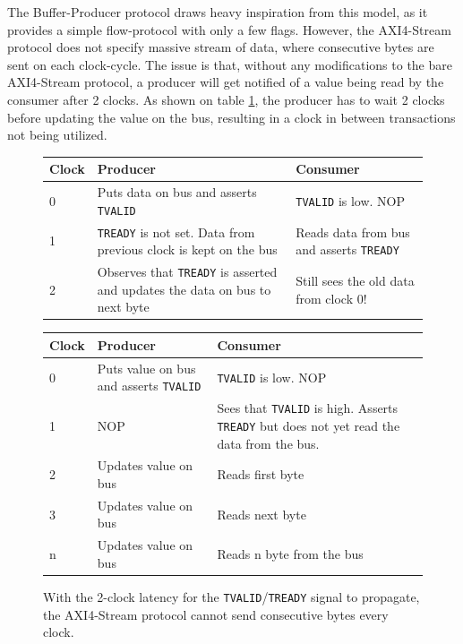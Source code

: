 The Buffer-Producer protocol draws heavy inspiration from this model, as it
provides a simple flow-protocol with only a few flags. However, the AXI4-Stream
protocol does not specify massive stream of data, where consecutive bytes are
sent on each clock-cycle. The issue is that, without any modifications to the
bare AXI4-Stream protocol, a producer will get notified of a value being read
by the consumer after 2 clocks. As shown on table
\ref{tab:axi4_stream_latency}, the producer has to wait 2 clocks before
updating the value on the bus, resulting in a clock in between transactions not
being utilized.


\begin{figure}

  \begin{minipage}[b]{0.4\textwidth}

	\begin{tabular}{p{0.9cm} | p{2.4cm} | p{2.4cm}}
\toprule
\cmidrule(r){1-2}
		\textbf{Clock} & \textbf{Producer} & \textbf{Consumer} \\
\midrule
		0 & Puts data on bus and asserts \texttt{TVALID} &
		\texttt{TVALID} is low. NOP \\ \hline
		1 & \texttt{TREADY} is not set. Data from previous clock is
		kept on the bus & Reads data from bus and asserts \texttt{TREADY}\\ \hline
		2 & Observes that \texttt{TREADY} is asserted and updates the
		data on bus to next byte & \cellcolor{red!25} Still sees the
		old data from clock $0$!\\
\bottomrule
\end{tabular}
	\caption{With the 2-clock latency for the \texttt{TVALID}/\texttt{TREADY}
	signal to propagate, the AXI4-Stream protocol cannot send consecutive
	bytes every clock.}
\label{tab:axi4_stream_latency}
\end{minipage}


  \begin{minipage}[b]{0.4\textwidth}

	\begin{tabular}{p{0.9cm} | p{2.4cm} | p{2.4cm}}
\toprule
\cmidrule(r){1-2}
		\textbf{Clock} & \textbf{Producer} & \textbf{Consumer} \\
\midrule
		0 & Puts value on bus and asserts \texttt{TVALID} &
		\texttt{TVALID} is low. NOP \\ \hline
		1 & NOP & Sees that \texttt{TVALID} is high. Asserts
		\texttt{TREADY} but does not yet read the data from the bus.\\ \hline
		2 & Updates value on bus & Reads first byte \\ \hline
		3 & Updates value on bus & \cellcolor{green!25} Reads next byte \\ \hline
		n & Updates value on bus & \cellcolor{green!25} Reads n byte from the bus \\


\end{tabular}
\end{minipage}
\end{figure}
